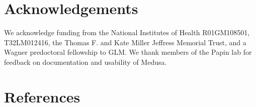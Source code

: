 \documentclass[11pt,onecolumn,notitlepage,openany,twoside]{book}
\begin{document}
\begin{refsection}
\section{Acknowledgements}

We acknowledge funding from the National Institutes of Health R01GM108501, T32LM012416, the Thomas F. and Kate Miller Jeffress Memorial Trust, and a Wagner predoctoral fellowship to GLM. We thank members of the Papin lab for feedback on documentation and usability of Medusa.

\section{References}

\printbibliography[heading=none]
\end{refsection}

\end{document}
